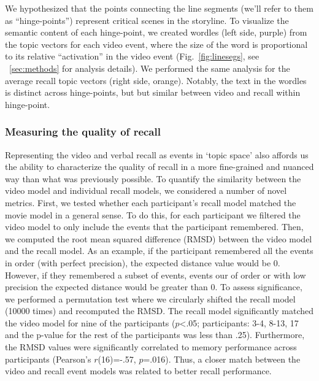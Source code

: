 \documentclass{article}
\begin{document}
{We hypothesized that the points connecting the line segments (we'll refer to them as ``hinge-points'') represent critical scenes in the storyline. To visualize the semantic content of each hinge-point, we created wordles (left side, purple) from the topic vectors for each video event, where the size of the word is proportional to its relative ``activation'' in the video event (Fig.~\ref{fig:linesegs}, see ~\ref{sec:methods} for analysis details). We performed the same analysis for the average recall topic vectors (right side, orange). Notably, the text in the wordles is distinct across hinge-points, but but similar between video and recall within hinge-point.

\subsubsection{Measuring the quality of recall}
Representing the video and verbal recall as events in `topic space' also affords us the ability to characterize the quality of recall in a more fine-grained and nuanced way than what was previously possible. To quantify the similarity between the video model and individual recall models, we considered a number of novel metrics.  First, we tested whether each participant's recall model matched the movie model in a general sense. To do this, for each participant we filtered the video model to only include the events that the participant remembered. Then, we computed the root mean squared difference (RMSD) between the video model and the recall model. As an example, if the participant remembered all the events in order (with perfect precision), the expected distance value would be 0. However, if they remembered a subset of events, events our of order or with low precision the expected distance would be greater than 0. To assess significance, we performed a permutation test where we circularly shifted the recall model (10000 times) and recomputed the RMSD. The recall model significantly matched the video model for nine of the participants ($p$<.05; participants: 3-4, 8-13, 17 and the p-value for the rest of the participants was less than .25). Furthermore, the RMSD values were significantly correlated to memory performance across participants (Pearson's $r$(16)=-.57, $p$=.016). Thus, a closer match between the video and recall event models was related to better recall performance.

}
\end{document}
